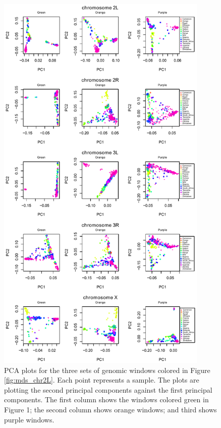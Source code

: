 \documentclass[11pt, oneside]{article}   	%
\begin{document}
\begin{figure}
    \begin{center}
       \includegraphics[width=0.9\textwidth]{Fig2_all_pca_plots}
    \end{center}
    \caption{      
        PCA plots for the three sets of genomic windows colored in Figure \ref{fig:mds_chr2L}. 
        Each point represents a sample. 
        The plots are plotting the second principal components against the first principal components. 
        The first column shows the windows colored green in Figure 1; the second column shows orange windows; and third shows purple windows.
         \label{fig:pca_chr2L}
    }
\end{figure}
\end{document}
